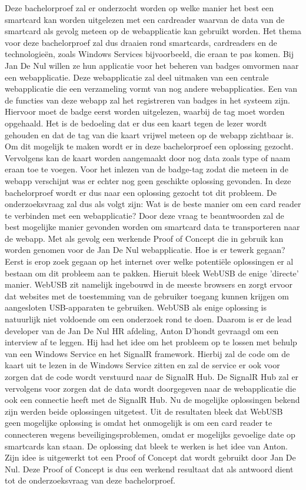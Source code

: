 Deze bachelorproef zal er onderzocht worden op welke manier het best een smartcard kan worden uitgelezen met een cardreader waarvan de data van de smartcard als gevolg meteen op de webapplicatie kan gebruikt worden. Het thema voor deze bachelorproef zal dus draaien rond smartcards, cardreaders en de technologieën, zoals Windows Services bijvoorbeeld, die eraan te pas komen. Bij Jan De Nul willen ze hun applicatie voor het beheren van badges omvormen naar een webapplicatie. Deze webapplicatie zal deel uitmaken van een centrale webapplicatie die een verzameling vormt van nog andere webapplicaties. Een van de functies van deze webapp zal het registreren van badges in het systeem zijn. Hiervoor moet de badge eerst worden uitgelezen, waarbij de tag moet worden opgehaald. Het is de bedoeling dat er dus een kaart tegen de lezer wordt gehouden en dat de tag van die kaart vrijwel meteen op de webapp zichtbaar is. Om dit mogelijk te maken wordt er in deze bachelorproef een oplossing gezocht. Vervolgens kan de kaart worden aangemaakt door nog data zoals type of naam eraan toe te voegen. 
Voor het inlezen van de badge-tag zodat die meteen in de webapp verschijnt was er echter nog geen geschikte oplossing gevonden. In deze bachelorproef wordt er dus naar een oplossing gezocht tot dit probleem. De onderzoeksvraag zal dus als volgt zijn: Wat is de beste manier om een card reader te verbinden met een webapplicatie? Door deze vraag te beantwoorden zal de best mogelijke manier gevonden worden om smartcard data te transporteren naar de webapp. Met als gevolg een werkende Proof of Concept die in gebruik kan worden genomen voor de Jan De Nul webapplicatie.
Hoe is er tewerk gegaan? Eerst is erop zoek gegaan op het internet over welke potentiële oplossingen er al bestaan om dit probleem aan te pakken. Hieruit bleek WebUSB de enige 'directe' manier. WebUSB zit namelijk ingebouwd in de meeste browsers en zorgt ervoor dat websites met de toestemming van de gebruiker toegang kunnen krijgen om aangesloten USB-apparaten te gebruiken. WebUSB als enige oplossing is natuurlijk niet voldoende om een onderzoek rond te doen. Daarom is er de lead developer van de Jan De Nul HR afdeling, Anton D'hondt gevraagd om een interview af te leggen. Hij had het idee om het probleem op te lossen met behulp van een Windows Service en het SignalR framework. Hierbij zal de code om de kaart uit te lezen in de Windows Service zitten en zal de service er ook voor zorgen dat de code wordt verstuurd naar de SignalR Hub. De SignalR Hub zal er vervolgens voor zorgen dat de data wordt doorgegeven naar de webapplicatie die ook een connectie heeft met de SignalR Hub. Nu de mogelijke oplossingen bekend zijn werden beide oplossingen uitgetest. 
Uit de resultaten bleek dat WebUSB geen mogelijke oplossing is omdat het onmogelijk is om een card reader te connecteren wegens beveiligingsproblemen, omdat er mogelijks gevoelige date op smartcards kan staan. De oplossing dat bleek te werken is het idee van Anton. Zijn idee is uitgewerkt tot een Proof of Concept dat wordt gebruikt door Jan De Nul. Deze Proof of Concept is dus een werkend resultaat dat als antwoord dient tot de onderzoeksvraag van deze bachelorproef.
